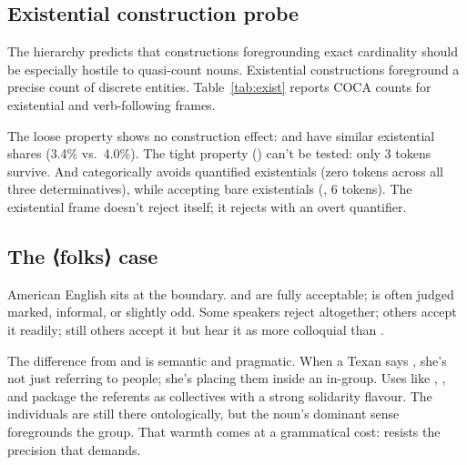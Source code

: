 \documentclass[12pt,a4paper]{article}
\DeclareRobustCommand{\mentionhead}[1]{⟨\textup{#1}⟩} %
\begin{document}


\subsection{Existential construction probe}\label{sec:existential}

The hierarchy predicts that constructions foregrounding exact cardinality should be especially hostile to quasi-count nouns. Existential  constructions foreground a precise count of discrete entities. Table~\ref{tab:exist} reports COCA counts for existential and verb-following frames.



The loose property shows no construction effect:  and  have similar existential shares (3.4\% vs.\ 4.0\%). The tight property () can't be tested: only 3 tokens survive. And  categorically avoids quantified existentials (zero tokens across all three determinatives), while accepting bare existentials (, 6 tokens). The existential frame doesn't reject  itself; it rejects  with an overt quantifier.

\subsection{The \mentionhead{folks} case}\label{sec:folks}

American English  sits at the boundary.  and  are fully acceptable;  is often judged marked, informal, or slightly odd. Some speakers reject  altogether; others accept it readily; still others accept it but hear it as more colloquial than .

The difference from  and  is semantic and pragmatic. When a Texan says , she's not just referring to people; she's placing them inside an in-group. Uses like , , and  package the referents as collectives with a strong solidarity flavour. The individuals are still there ontologically, but the noun's dominant sense foregrounds the group. That warmth comes at a grammatical cost:  resists the precision that  demands.
\end{document}
